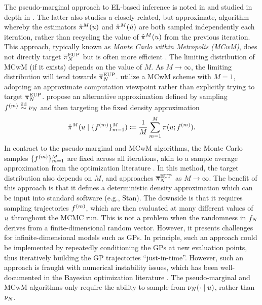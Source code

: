 \documentclass[12pt]{article}
\begin{document}
The pseudo-marginal approach to EL-based inference is noted in \citep{StuartTeck1} and studied 
in depth in \citep{garegnani2021NoisyMCMC}. The latter also studies a closely-related, but approximate, algorithm
whereby the estimators $\hat{\pi}^M(u)$ and $\hat{\pi}^M(\tilde{u})$ are both sampled independently
each iteration, rather than recycling the value of $\hat{\pi}^M(u)$ from the previous iteration. This approach, 
typically known as \textit{Monte Carlo within Metropolis (MCwM)}, does not directly target $\overline{\pi}_{N}^{\mathrm{EUP}}$
but is often more efficient \citep{noisyMCMC,stabilityNoisyMH,noisyMCSurvey}.
The limiting distribution of MCwM (if it exists) depends on the value of $M$. As $M \to \infty$, the limiting distribution 
will tend towards $\overline{\pi}_{N}^{\mathrm{EUP}}$. \citet{FerEmulation} utilize a MCwM scheme with $M = 1$, adopting an
approximate computation viewpoint rather than explicitly trying to target $\overline{\pi}_{N}^{\mathrm{EUP}}$.
\citet{BurknerSurrogate} propose an alternative approximation defined by sampling 
$f^{(m)} \overset{\mathrm{iid}}{\sim} \nu_{N}$ and then targeting the fixed density approximation
\begin{align}
\hat{\pi}^M(u \mid \{f^{(m)}\}_{m=1}^{M}) \coloneqq 
\frac{1}{M} \sum_{m=1}^{M} \pi(u; f^{(m)}).
\end{align}
In contract to the pseudo-marginal and MCwM algorithms, the Monte Carlo samples $\{f^{(m)}\}_{m=1}^{M}$
are fixed across all iterations, akin to a sample average approximation from the optimization literature
\citep{SAA}. In this method, the target distribution also depends on $M$, and approaches $\overline{\pi}_{N}^{\mathrm{EUP}}$
as $M \to \infty$. The benefit of this approach is that it defines a deterministic density approximation which can be input
into standard software (e.g., Stan). The downside is that it requires sampling trajectories $f^{(m)}$, which are 
then evaluated at many different values of $u$ throughout the MCMC run. This is not a problem when the randomness
in $f_{N}$ derives from a finite-dimensional random vector. However, it presents challenges for infinite-dimensional models
such as GPs. In principle, such an approach could be implemented by repeatedly conditioning the GPs at new evaluation points,
thus iteratively building the GP trajectories ``just-in-time''. However, such an approach is fraught with numerical instability issues,
which has been well-documented in the Bayesian optimization literature \citep{pathwiseConditioning}. 
The pseudo-marginal and MCwM algorithms only require the ability to sample from $\nu_{N}(\cdot \mid u)$, 
rather than $\nu_{N}$.
\end{document}
